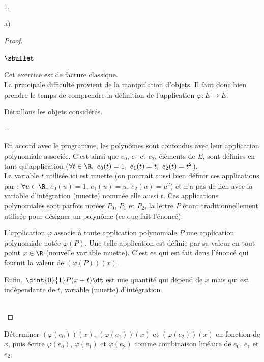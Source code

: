 \begin{noliste}{1.}
\begin{noliste}{a)}
\begin{proof}
      
      \begin{remark}%
        \begin{noliste}{$\sbullet$}
        \item Cet exercice est de facture classique.\\
          La principale difficulté provient de la manipulation
          d'objets. Il faut donc bien prendre le temps de comprendre
          la définition de l'application $\varphi : E \to E$.
        \item Détaillons les objets considérés.
          \begin{noliste}{$-$}
          \item En accord avec le programme, les polynômes sont
            confondus avec leur application polynomiale
            associée. C'est ainsi que $e_0$, $e_1$ et $e_2$, éléments
            de $E$, sont définies en tant qu'application ($\forall t
            \in \R, \ e_{0}(t) = 1, \ e_{1}(t) = t, \ e_{2}(t) =
            t^{2}$).\\
            La variable $t$ utilisée ici est muette (on pourrait aussi
            bien définir ces applications par : $\forall u \in \R$,
            $e_0(u) = 1$, $e_{1}(u) = u$, $e_2(u) = u^2$) et n'a pas
            de lien avec la variable d'intégration (muette) nommée
            elle aussi $t$. Ces applications polynomiales sont parfois
            notées $P_0$, $P_1$ et $P_2$, la lettre $P$ étant
            traditionnellement utilisée pour désigner un polynôme (ce
            que fait l'énoncé).
          \item L'application $\varphi$ associe à toute application
            polynomiale $P$ une application polynomiale notée
            $\varphi(P)$. Une telle application est définie par sa
            valeur en tout point $x \in \R$ (nouvelle variable
            muette). C'est ce qui est fait dans l'énoncé qui fournit
            la valeur de $(\varphi(P))(x)$.
          \item Enfin, $\dint{0}{1} P(x+t) \dt$ est une quantité qui
            dépend de $x$ mais qui est indépendante de $t$, variable
            (muette) d'intégration.
          \end{noliste}
        \end{noliste}
      \end{remark}~\\[-1.2cm]
    \end{proof}
    
  \item Déterminer $\left(\varphi(e_{0})\right)(x)$,
    $\left(\varphi(e_{1})\right)(x)$ et
    $\left(\varphi(e_{2})\right)(x)$ en fonction de $x$, puis écrire
    $\varphi(e_{0})$, $\varphi(e_{1})$ et $\varphi(e_{2})$ comme
    combinaison linéaire de $e_{0}$, $e_{1}$ et $e_{2}$.


\end{noliste}
\end{noliste}
